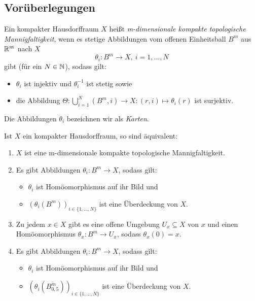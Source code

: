 \subsection{Vorüberlegungen}

\begin{defn}\label{defn:TopMan}
Ein kompakter Hausdorffraum $X$ heißt \emph{m-dimensionale kompakte topologische Mannigfaltigkeit}, wenn es stetige Abbildungen vom offenen Einheitsball $B^m$ aus $\mathbb{R}^m$ nach $X$
\[ \theta_i: B^m \to X, ~i = 1, \dots, N \]
gibt (für ein $N \in \mathbb{N}$), sodass gilt:
\begin{itemize}
	\item $\theta_i$ ist injektiv und $\theta_i^{-1}$ ist stetig sowie
	\item die Abbildung $\Theta: \bigcup_{i=1}^N(B^m,i) \to X: (r,i) \mapsto \theta_i(r)$ ist surjektiv.
\end{itemize}
Die Abbildungen $\theta_i$ bezeichnen wir als \emph{Karten}.
\end{defn}

\begin{prop}\label{prop:topManAlt}
Ist $X$ ein kompakter Hausdorffraum, so sind äquivalent:
\begin{enumerate}
	\item \label{prop:topManAlt:is}
		$X$ ist eine m-dimensionale kompakte topologische Mannigfaltigkeit.
	\item \label{prop:topManAlt:endl}
		Es gibt Abbildungen $\theta_i: B^m \to X$, sodass gilt:
		\begin{itemize}
			\item $\theta_i$ ist Homöomorphismus auf ihr Bild und
			\item $(\theta_i(B^m))_{i\in\{1,\dots,N\}}$ ist eine Überdeckung von $X$.
		\end{itemize}	\item \label{prop:topManAlt:pkt}
		Zu jedem $x \in X$ gibt es eine offene Umgebung $U_x \subseteq X$ von $x$ und einen Homöomorphismus $\theta_x: B^m \to U_x$, sodass $\theta_x(0) = x$.
	\item  \label{prop:topManAlt:abg}
		Es gibt Abbildungen $\theta_i: B^m \to X$, sodass gilt:
		\begin{itemize}
			\item $\theta_i$ ist Homöomorphismus auf ihr Bild und
			\item $(\theta_i(\overline{B_{0,5}^m}))_{i\in\{1,\dots,N\}}$ ist eine Überdeckung von $X$.
		\end{itemize}
\end{enumerate}
\end{prop}

